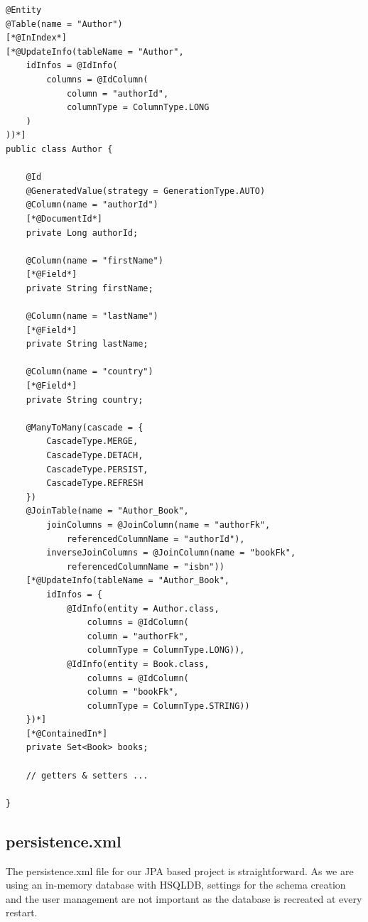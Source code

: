 \lstset{language=java}
\begin{lstlisting}[frame=htrbl, caption={Complete Author.java}, label={lst:author.java_complete}]
@Entity
@Table(name = "Author")
[*@InIndex*]
[*@UpdateInfo(tableName = "Author", 
	idInfos = @IdInfo(
		columns = @IdColumn(
			column = "authorId",
			columnType = ColumnType.LONG
	)
))*]
public class Author {
	
	@Id
	@GeneratedValue(strategy = GenerationType.AUTO)
	@Column(name = "authorId")
	[*@DocumentId*]
	private Long authorId;
	
	@Column(name = "firstName")
	[*@Field*]
	private String firstName;
	
	@Column(name = "lastName")
	[*@Field*]
	private String lastName;
	
	@Column(name = "country")
	[*@Field*]
	private String country;
	
	@ManyToMany(cascade = {
		CascadeType.MERGE,
		CascadeType.DETACH,
		CascadeType.PERSIST,
		CascadeType.REFRESH
	})
	@JoinTable(name = "Author_Book", 
		joinColumns = @JoinColumn(name = "authorFk", 
			referencedColumnName = "authorId"),
		inverseJoinColumns = @JoinColumn(name = "bookFk",
			referencedColumnName = "isbn"))
	[*@UpdateInfo(tableName = "Author_Book",
		idInfos = {
			@IdInfo(entity = Author.class,
				columns = @IdColumn(
				column = "authorFk",
				columnType = ColumnType.LONG)),
			@IdInfo(entity = Book.class,
				columns = @IdColumn(
				column = "bookFk",
				columnType = ColumnType.STRING))
	})*]
	[*@ContainedIn*]
	private Set<Book> books;
	
	// getters & setters ...
	
}
\end{lstlisting}


\pagebreak

\subsection{persistence.xml}

The persistence.xml file for our JPA based project is straightforward. As we are using an in-memory database with HSQLDB, settings for the schema creation and the user management are not important as the database is recreated at every restart.
\\

